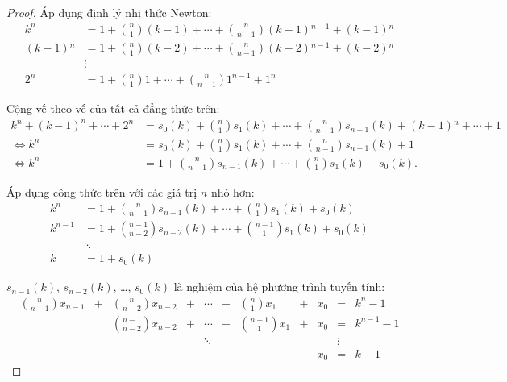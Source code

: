 \begin{proof}
    Áp dụng định lý nhị thức Newton:
    \begin{align*}
        k^{n}       & = 1 + \binom{n}{1}(k-1) + \cdots + \binom{n}{n-1}(k-1){}^{n-1} + (k-1){}^{n} \\
        (k-1){}^{n} & = 1 + \binom{n}{1}(k-2) + \cdots + \binom{n}{n-1}(k-2){}^{n-1} + (k-2){}^{n} \\
                    & \vdots                                                                       \\
        2^{n}       & = 1 + \binom{n}{1}1     + \cdots + \binom{n}{n-1}1^{n-1} + 1^{n}
    \end{align*}
    
    Cộng vế theo vế của tất cả đẳng thức trên:
    \begin{align*}
        k^{n} + {(k-1)}^{n} + \cdots + 2^{n} & = s_{0}(k) + \binom{n}{1}s_{1}(k) + \cdots + \binom{n}{n-1}s_{n-1}(k) + (k-1){}^{n} + \cdots + 1 \\
        \Longleftrightarrow k^{n}            & = s_{0}(k) + \binom{n}{1}s_{1}(k) + \cdots + \binom{n}{n-1}s_{n-1}(k) + 1                        \\
        \Longleftrightarrow k^{n}            & = 1 + \binom{n}{n-1}s_{n-1}(k) + \cdots + \binom{n}{1}s_{1}(k) + s_{0}(k).
    \end{align*}

    Áp dụng công thức trên với các giá trị $n$ nhỏ hơn:
    \begin{align*}
        k^{n}   & = 1 + \binom{n}{n-1}s_{n-1}(k) + \cdots + \binom{n}{1}s_{1}(k) + s_{0}(k)     \\
        k^{n-1} & = 1 + \binom{n-1}{n-2}s_{n-2}(k) + \cdots + \binom{n-1}{1}s_{1}(k) + s_{0}(k) \\
                & \ddots                                                                        \\
        k       & = 1 + s_{0}(k)
    \end{align*}
    
    $s_{n-1}(k)$, $s_{n-2}(k)$, \ldots, $s_{0}(k)$ là nghiệm của hệ phương trình tuyến tính:
    \[
        \begin{array}{ccccccccccc}
            \binom{n}{n-1}x_{n-1} & + & \binom{n}{n-2}x_{n-2}   & + & \cdots & + & \binom{n}{1}x_{1}   & + & x_{0} & =      & k^{n} - 1   \\
                                  &   & \binom{n-1}{n-2}x_{n-2} & + & \cdots & + & \binom{n-1}{1}x_{1} & + & x_{0} & =      & k^{n-1} - 1 \\
                                  &   &                         &   & \ddots &   &                     &   &       & \vdots &             \\
                                  &   &                         &   &        &   &                     &   & x_{0} & =      & k - 1
        \end{array}
    \]
    

\end{proof}
